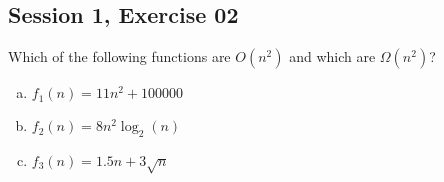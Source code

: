 \subsection{Session 1, Exercise 02}


Which of the following functions are $O(n^2)$ and which are $\Omega(n^2)$?

\begin{enumerate}[a.)]
\item $f_1(n) = 11n^2 + 100000$
\item $f_2(n) = 8n^2\log_2(n)$
\item $f_3(n) = 1.5n + 3\sqrt{n}$
\end{enumerate}

